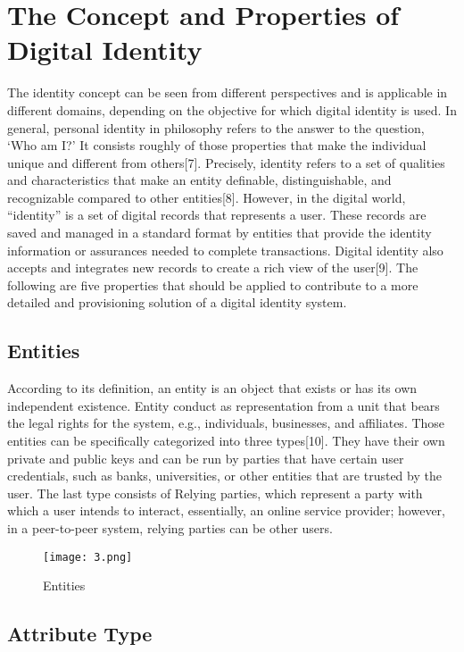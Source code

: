\section{The Concept and Properties of Digital Identity}

The identity concept can be seen from different perspectives and is applicable in different domains, depending on the objective for which digital identity is used. In general, personal identity in philosophy refers to the answer to the question, ‘Who am I?’ It consists roughly of those properties that make the individual unique and different from others[7]. Precisely, identity refers to a set of qualities and characteristics that make an entity definable, distinguishable, and recognizable compared to other entities[8]. However, in the digital world, “identity” is a set of digital records that represents a user. These records are saved and managed in a standard format by entities that provide the identity information or assurances needed to complete transactions. Digital identity also accepts and integrates new records to create a rich view of the user[9]. The following are five properties that should be applied to contribute to a more detailed and provisioning solution of a digital identity system.

\subsection{Entities}

According to its definition, an entity is an object that exists or has its own independent existence. Entity conduct as representation from a unit that bears the legal rights for the system, e.g., individuals, businesses, and affiliates. Those entities can be specifically categorized into three types[10]. They have their own private and public keys and can be run by parties that have certain user credentials, such as banks, universities, or other entities that are trusted by the user. The last type consists of Relying parties, which represent a party with which a user intends to interact, essentially, an online service provider; however, in a peer-to-peer system, relying parties can be other users.

\begin{figure}[H]
    \centering
    \texttt{[image: 3.png]}
    \caption{Entities}
    \label{fig:threshold}
  \end{figure}

 \subsection{Attribute Type}

